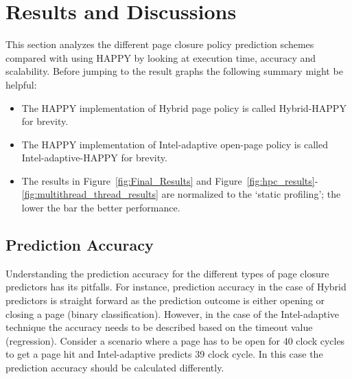 \section{Results and Discussions}
\label{sec:Results_and_Discussions}

This section analyzes the different page closure policy prediction schemes compared with using HAPPY by looking at execution time, accuracy and scalability. Before jumping to the result graphs the following summary might be helpful: \\

\begin{itemize}

\item The HAPPY implementation of Hybrid page policy is called
  Hybrid-HAPPY for brevity.

\item The HAPPY implementation of Intel-adaptive open-page policy is
  called Intel-adaptive-HAPPY for brevity.



\item The results in Figure~\ref{fig:Final_Results} and Figure~\ref{fig:hpc_results}-\ref{fig:multithread_thread_results} are
  normalized to the `static profiling'; the lower the bar
  the better performance.





\end{itemize}


\subsection{Prediction Accuracy} 

Understanding the prediction accuracy for the different types of page closure predictors has its pitfalls. For instance, prediction accuracy in the case of Hybrid predictors is straight forward as the prediction outcome is either opening or closing a page (binary classification). However, in the case of the Intel-adaptive technique the accuracy needs to be described based on the timeout value (regression). Consider a scenario where a page has to be open for 40 clock cycles to get a page hit and Intel-adaptive predicts 39 clock cycle. In this case the prediction accuracy should be calculated differently. 

